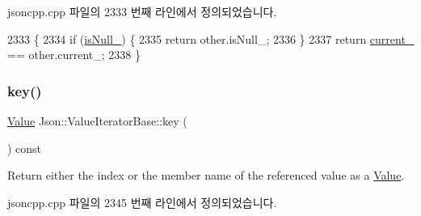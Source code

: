jsoncpp.\+cpp 파일의 2333 번째 라인에서 정의되었습니다.


\begin{DoxyCode}
2333                                                            \{
2334   \textcolor{keywordflow}{if} (\hyperlink{class_json_1_1_value_iterator_base_a3e08b114a1aed9bde518c527f94a8c59}{isNull\_}) \{
2335     \textcolor{keywordflow}{return} other.isNull\_;
2336   \}
2337   \textcolor{keywordflow}{return} \hyperlink{class_json_1_1_value_iterator_base_ab3138ce8af8301cca3b041ea55cb922a}{current\_} == other.current\_;
2338 \}
\end{DoxyCode}
\mbox{\label{class_json_1_1_value_iterator_base_a3838ba39c43c518cf3ed4aa6ce78ccad}} 
\subsubsection{\texorpdfstring{key()}{key()}}
{\footnotesize\ttfamily \hyperlink{class_json_1_1_value}{Value} Json\+::\+Value\+Iterator\+Base\+::key (\begin{DoxyParamCaption}{ }\end{DoxyParamCaption}) const\hspace{0.3cm}{\ttfamily [inherited]}}

Return either the index or the member name of the referenced value as a \hyperlink{class_json_1_1_value}{Value}. 

jsoncpp.\+cpp 파일의 2345 번째 라인에서 정의되었습니다.


